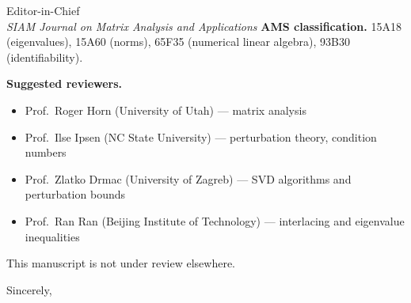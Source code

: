 \documentclass[11pt,a4paper]{letter}
\begin{document}
\begin{letter}{Editor-in-Chief\\
               \textit{SIAM Journal on Matrix Analysis and Applications}}
\textbf{AMS classification.} 15A18 (eigenvalues), 15A60 (norms),
65F35 (numerical linear algebra), 93B30 (identifiability).

\textbf{Suggested reviewers.}
\begin{itemize}
  \item Prof.\ Roger Horn (University of Utah) --- matrix analysis
  \item Prof.\ Ilse Ipsen (NC State University) --- perturbation theory,
        condition numbers
  \item Prof.\ Zlatko Drmac (University of Zagreb)
        --- SVD algorithms and perturbation bounds
  \item Prof.\ Ran Ran (Beijing Institute of Technology)
        --- interlacing and eigenvalue inequalities
\end{itemize}

This manuscript is not under review elsewhere.

\closing{Sincerely,}
\end{letter}
\end{document}
